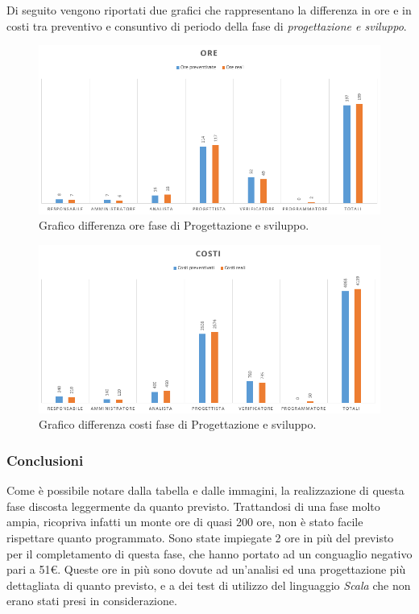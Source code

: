 \documentclass[a4paper]{article}
\begin{document}
				Di seguito vengono riportati due grafici che rappresentano la differenza in ore e in costi tra preventivo e consuntivo di periodo della 
				fase di \emph{progettazione e sviluppo}.
				\begin{figure}[H]
					\centering
					\includegraphics[width=\textwidth]{diff_h_pr}
					\caption{Grafico differenza ore fase di Progettazione e sviluppo.}
				\end{figure}
				\begin{figure}[H]
					\centering
					\includegraphics[width=\textwidth]{diff_c_pr}
					\caption{Grafico differenza costi fase di Progettazione e sviluppo.}
				\end{figure}
				
				\subsubsection{Conclusioni}
                    Come è possibile notare dalla tabella e dalle immagini, la realizzazione di questa fase discosta leggermente da quanto previsto. Trattandosi di una fase 
                    molto ampia, ricopriva infatti un monte ore di quasi 200 ore, non è stato facile rispettare quanto programmato. Sono state impiegate 
                    2 ore in più del previsto per il completamento di questa fase, che hanno portato ad un conguaglio negativo pari a 51\euro.
                    Queste ore in più sono dovute ad un'analisi ed una progettazione più dettagliata di quanto previsto, e a dei test di utilizzo del 
                    linguaggio \emph{Scala} che non erano stati presi in considerazione. 
				
\end{document}
